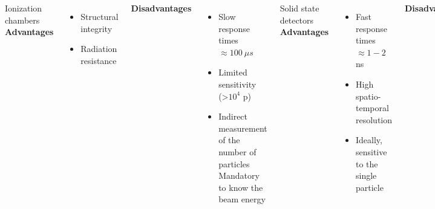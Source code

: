 \documentclass[aspectratio=169]{beamer}
\begin{document}
\begin{frame}
\begin{columns}
\begin{center}
			\end{center}
			{\color{blue} Ionization chambers}
			\newline
			\textbf{Advantages}
			\begin{itemize}
				\item Structural integrity
				\item Radiation resistance
			\end{itemize}
			\textbf{Disadvantages}
			\begin{itemize}
				\item Slow response times $\approx 100\:\mu s$
				\item Limited sensitivity (>$10^4$ p)
				\item Indirect measurement of the number of particles \\{\tiny Mandatory to know the beam energy}
			\end{itemize}
			{\color{blue} Solid state detectors}
			\newline
			\textbf{Advantages}
			\begin{itemize}
				\item Fast response times $\approx 1-2$ ns
				\item High spatio-temporal resolution
				\item Ideally, sensitive to the single particle
			\end{itemize}
			\textbf{Disadvantages}
			\begin{itemize}
				\item Complex and fast readout electronics
				\item Damage from radiation
				\item pile-up effects at high\newline rates
			\end{itemize}
		\end{columns}
	\end{frame}
\end{document}
